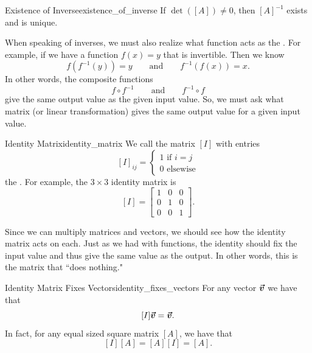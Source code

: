         \begin{prop}{Existence of Inverse}{existence_of_inverse}
        If $\det([A])\neq 0$, then $[A]^{-1}$ exists and is unique.
        \end{prop}
        
        When speaking of inverses, we must also realize what function acts as the .  For example, if we have a function $f(x)=y$ that is invertible. Then we know
        \[
        f(f^{-1}(y))=y \qquad \textrm{and} \qquad f^{-1}(f(x))=x.
        \]
        In other words, the composite functions
        \[
        f\circ f^{-1} \qquad \textrm{and} \qquad f^{-1} \circ f
        \]
        give the same output value as the given input value.  So, we must ask what matrix (or linear transformation) gives the same output value for a given input value.
        
        \begin{df}{Identity Matrix}{identity_matrix}
        We call the matrix $[I]$ with entries 
        \[[I]_{ij}=
        \begin{cases}
        1 \textrm{ if } i=j\\
        0 \textrm{ elsewise}
        \end{cases}
        \]
        the .  For example, the $3\times 3$ identity matrix is
        \[[I]=
        \begin{bmatrix}
        1 & 0 & 0\\
        0 & 1 & 0\\
        0 & 0 & 1
        \end{bmatrix}.
        \]
        \end{df}
        
        Since we can multiply matrices and vectors, we should see how the identity matrix acts on each.  Just as we had with functions, the identity should fix the input value and thus give the same value as the output.  In other words, this is the matrix that ``does nothing."
        
        \begin{prop}{Identity Matrix Fixes Vectors}{identity_fixes_vectors}
        For any vector $\boldsymbol{\boldsymbol{\vec{v}}}$ we have that
        \[
        [I]\boldsymbol{\boldsymbol{\vec{v}}}=\boldsymbol{\boldsymbol{\vec{v}}}.
        \]
        In fact, for any equal sized square matrix $[A]$, we have that
        \[
        [I][A]=[A][I]=[A].
        \]
        \end{prop}
        
